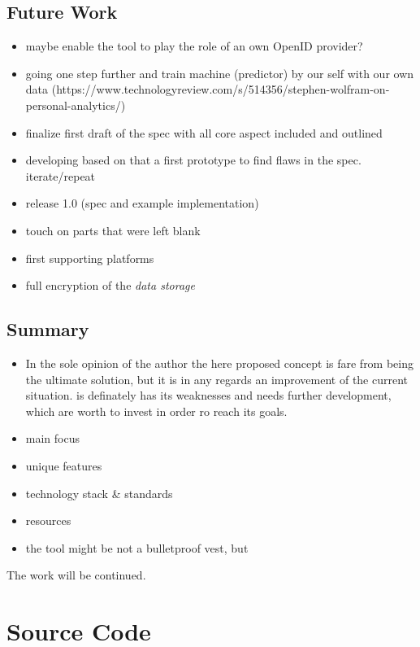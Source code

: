 \documentclass[12pt,english,a4paper,titlepage,cleardoublepage=empty,dottedtoc]{report}
\begin{document}
\section{Future Work}\label{future-work}

\begin{itemize}
\item
  maybe enable the tool to play the role of an own OpenID provider?
\item
  going one step further and train machine (predictor) by our self with
  our own data
  (https://www.technologyreview.com/s/514356/stephen-wolfram-on-personal-analytics/)
\item
  finalize first draft of the spec with all core aspect included and
  outlined
\item
  developing based on that a first prototype to find flaws in the spec.
  iterate/repeat
\item
  release 1.0 (spec and example implementation)
\item
  touch on parts that were left blank
\item
  first supporting platforms
\item
  full encryption of the \emph{data storage}
\end{itemize}

\section{Summary}\label{summary}

\begin{itemize}
\item
  In the sole opinion of the author the here proposed concept is fare
  from being the ultimate solution, but it is in any regards an
  improvement of the current situation. is definately has its weaknesses
  and needs further development, which are worth to invest in order ro
  reach its goals.
\item
  main focus
\item
  unique features
\item
  technology stack \& standards
\item
  resources
\item
  the tool might be not a bulletproof vest, but
\end{itemize}

The work will be continued.

\chapter*{Source Code}\label{source-code}
\end{document}
